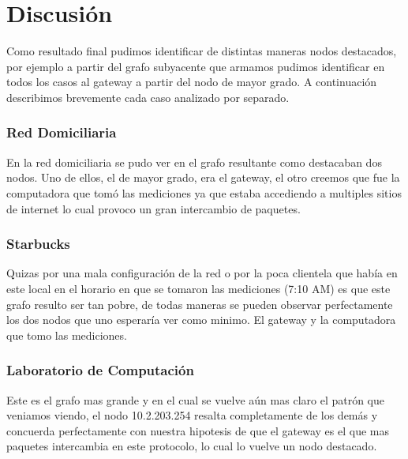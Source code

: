 \section{Discusión}

Como resultado final pudimos identificar de distintas maneras nodos destacados, por ejemplo a partir del grafo subyacente que armamos pudimos identificar en todos los casos al gateway a partir del nodo de mayor grado. A continuación describimos brevemente cada caso analizado por separado.

\subsubsection{Red Domiciliaria}

En la red domiciliaria se pudo ver en el grafo resultante como destacaban dos nodos. Uno de ellos, el de mayor grado, era el gateway, el otro creemos que fue la computadora que tomó las mediciones ya que estaba accediendo a multiples sitios de internet lo cual provoco un gran intercambio de paquetes.

\subsubsection{Starbucks}

Quizas por una mala configuración de la red o por la poca clientela que había en este local en el horario en que se tomaron las mediciones (7:10 AM) es que este grafo resulto ser tan pobre, de todas maneras se pueden observar perfectamente los dos nodos que uno esperaría ver como minimo. El gateway y la computadora que tomo las mediciones.

\subsubsection{Laboratorio de Computación}

Este es el grafo mas grande y en el cual se vuelve aún mas claro el patrón que veniamos viendo, el nodo 10.2.203.254 resalta completamente de los demás y concuerda perfectamente con nuestra hipotesis de que el gateway es el que mas paquetes intercambia en este protocolo, lo cual lo vuelve un nodo destacado.
